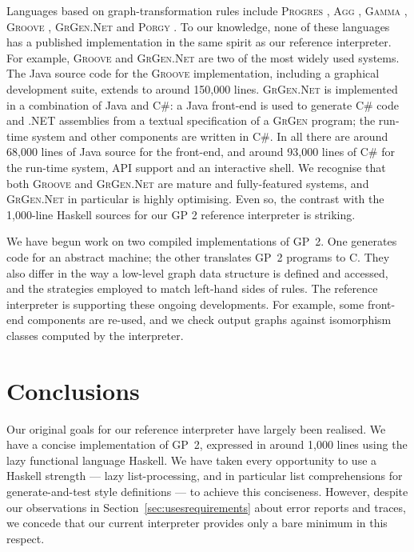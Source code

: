 Languages based on graph-transformation rules include
\textsc{Progres} \cite{Schuerr-Winter-Zuendorf99a},
\textsc{Agg} \cite{Ermel-Rudolf-Taentzer99a,Runge-Ermel-Taentzer11a},
\textsc{Gamma} \cite{Fradet-LeMetayer98a},
\textsc{Groove} \cite{Ghamarian-deMol-Rensink-Zambon-Zimakova12a},
\textsc{GrGen.Net} \cite{Jakumeit-Buchwald-Kroll10a} and
\textsc{Porgy} \cite{Fernandez-Kirchner-Mackie-Pinaud14a}.
To our knowledge, none of these languages has a published implementation in the same spirit as our reference interpreter. For example, \textsc{Groove} and \textsc{GrGen.Net} are two of the most widely used systems. The Java source code for the \textsc{Groove} implementation, including a graphical development suite, extends to around 150,000 lines. \textsc{GrGen.Net} is implemented in a combination of Java and C\#: a Java front-end is used to generate C\# code and .NET assemblies from a textual specification of a \textsc{GrGen} program; the run-time system and other components are written in C\#. In all there are around 68,000 lines of Java source for the front-end, and around 93,000 lines of C\# for the run-time system, API support and an interactive shell.
We recognise that both \textsc{Groove} and \textsc{GrGen.Net} are mature and fully-featured systems, and \textsc{GrGen.Net} in particular is highly optimising. Even so, the contrast with the 1,000-line Haskell sources for our GP 2 reference interpreter is striking.

We have begun work on two compiled implementations of GP~2. One generates code for an abstract machine; the other translates GP~2 programs to C. They also differ in the way a low-level graph data structure is defined and accessed, and the strategies employed to match left-hand sides of rules. The reference interpreter is supporting these ongoing developments. For example, some front-end components are re-used, and we check output graphs against isomorphism classes
computed by the interpreter.

\section{Conclusions}
\label{sec:conclusions}


Our original goals for our reference interpreter have largely been realised. We have a concise implementation of GP~2, expressed in around 1,000 lines using the lazy functional language Haskell. We have taken every opportunity to use a Haskell strength --- lazy list-processing, and in particular list comprehensions for generate-and-test style definitions --- to achieve this conciseness. However, despite our observations in Section~\ref{sec:usesrequirements} about error reports and traces, we concede that our current interpreter provides only a bare minimum in this respect.

